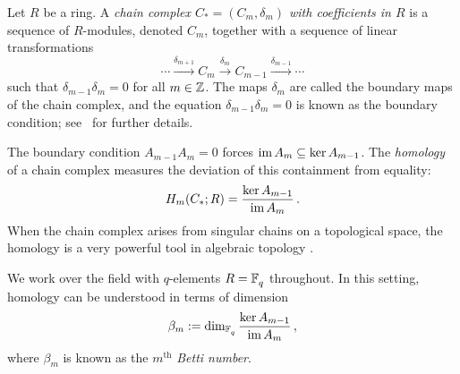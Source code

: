 Let $R$ be a ring. A {\em chain complex $C_*=(C_m, \delta_m)$ with coefficients in
$R$} is a sequence of $R$-modules, denoted $C_m$, together with a sequence of
linear transformations 
\[
  \cdots \xrightarrow{\delta_{m+1}} C_m \xrightarrow{\delta_m}
  C_{m-1} \xrightarrow{\delta_{m-1}} \cdots
\]
such that $\delta_{m-1}\delta_m = 0$ for all $m \in \mathbb{Z}$. The maps $\delta_m$
are called the boundary maps of the chain complex, and the equation
$\delta_{m-1} \delta_m = 0$ is known as the boundary condition;
see~\cite{hatcher2002algebraic} for further details.

The boundary condition $A_{m-1}A_m=0$ forces $\operatorname{\mathrm{im}} A_m \subseteq \ker A_{m-1}$.
The {\em homology} of a chain complex measures the deviation of this containment
from equality:
\begin{equation*}
  \label{eqn:hom}
  H_m(C_*;R) = \frac{\ker A_{m-1}}{\operatorname{\mathrm{im}} A_m} \, .
\end{equation*}
When the chain complex arises from singular chains on a topological
space, the homology is a very powerful tool in algebraic 
topology .

We work over the field with $q$-elements $R = \mathbb{F}_q^{}$ throughout. In this setting, 
homology can be understood in terms of dimension
\begin{equation*}
  \beta_m := \dim_{\mathbb{F}_q^{}} \frac{\ker A_{m-1}}{\operatorname{\mathrm{im}} A_m} \, ,
  \label{eqn:betti_numbers}
\end{equation*}
where $\beta_m$ is known as the $m^\mathrm{th}$ {\em Betti number}.

%

